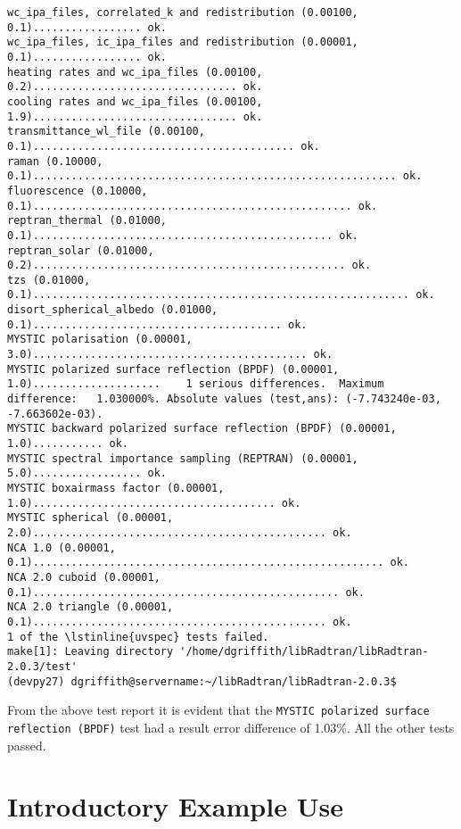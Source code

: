 \begin{enumerate}
\begin{lstlisting}[style=tinysize]
wc_ipa_files, correlated_k and redistribution (0.00100,   0.1)................. ok.
wc_ipa_files, ic_ipa_files and redistribution (0.00001,   0.1)................. ok.
heating rates and wc_ipa_files (0.00100,   0.2)................................ ok.
cooling rates and wc_ipa_files (0.00100,   1.9)................................ ok.
transmittance_wl_file (0.00100,   0.1)......................................... ok.
raman (0.10000,   0.1)......................................................... ok.
fluorescence (0.10000,   0.1).................................................. ok.
reptran_thermal (0.01000,   0.1)............................................... ok.
reptran_solar (0.01000,   0.2)................................................. ok.
tzs (0.01000,   0.1)........................................................... ok.
disort_spherical_albedo (0.01000,   0.1)....................................... ok.
MYSTIC polarisation (0.00001,   3.0)........................................... ok.
MYSTIC polarized surface reflection (BPDF) (0.00001,   1.0)....................    1 serious differences.  Maximum difference:   1.030000%. Absolute values (test,ans): (-7.743240e-03, -7.663602e-03).
MYSTIC backward polarized surface reflection (BPDF) (0.00001,   1.0)........... ok.
MYSTIC spectral importance sampling (REPTRAN) (0.00001,   5.0)................. ok.
MYSTIC boxairmass factor (0.00001,   1.0)...................................... ok.
MYSTIC spherical (0.00001,   2.0).............................................. ok.
NCA 1.0 (0.00001,   0.1)....................................................... ok.
NCA 2.0 cuboid (0.00001,   0.1)................................................ ok.
NCA 2.0 triangle (0.00001,   0.1).............................................. ok.
1 of the \lstinline{uvspec} tests failed.
make[1]: Leaving directory '/home/dgriffith/libRadtran/libRadtran-2.0.3/test'
(devpy27) dgriffith@servername:~/libRadtran/libRadtran-2.0.3$
\end{lstlisting}

From the above test report it is evident that the \lstinline{MYSTIC polarized surface reflection (BPDF)} test had a result error difference of 1.03\%.
All the other tests passed.

\end{enumerate}

\section{Introductory Example Use}

